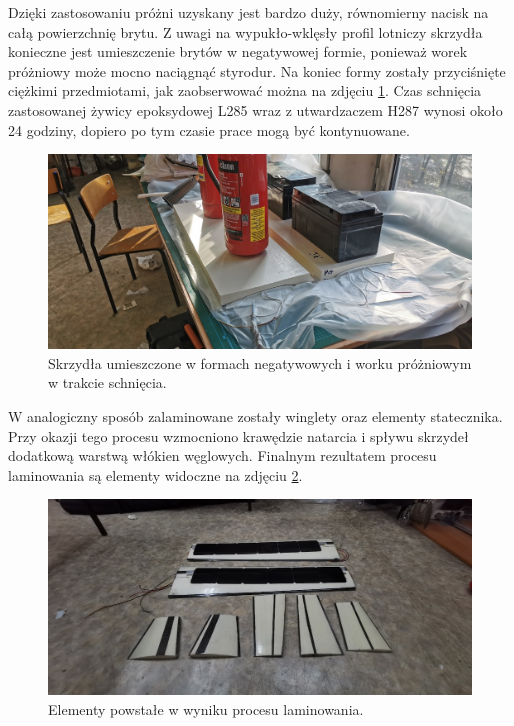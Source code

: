 \documentclass[12pt, a4paper]{article}
\begin{document}
Dzięki zastosowaniu próżni uzyskany jest bardzo duży, równomierny nacisk na całą powierzchnię brytu. Z uwagi na wypukło-wklęsły profil lotniczy skrzydła konieczne jest umieszczenie brytów w negatywowej formie, ponieważ worek próżniowy może mocno naciągnąć styrodur. Na koniec formy zostały przyciśnięte ciężkimi przedmiotami, jak zaobserwować można na zdjęciu \ref{fig:schniecie}. Czas schnięcia zastosowanej żywicy epoksydowej L285 wraz z utwardzaczem H287 wynosi około 24 godziny, dopiero po tym czasie prace mogą być kontynuowane.

 \begin{figure}[ht]
    \centering
    \includegraphics[width=1\textwidth]{budowa9}
    \caption{Skrzydła umieszczone w formach negatywowych i worku próżniowym w trakcie schnięcia.}
    \label{fig:schniecie}
\end{figure}

W analogiczny sposób zalaminowane zostały winglety oraz elementy statecznika. Przy okazji tego procesu wzmocniono krawędzie natarcia i spływu skrzydeł dodatkową warstwą włókien węglowych. Finalnym rezultatem procesu laminowania są elementy widoczne na zdjęciu \ref{fig:kompozytki}.

 \begin{figure}[ht]
    \centering
    \includegraphics[width=1\textwidth]{budowa11}
    \caption{Elementy powstałe w wyniku procesu laminowania.}
    \label{fig:kompozytki}
\end{figure}
\end{document}
